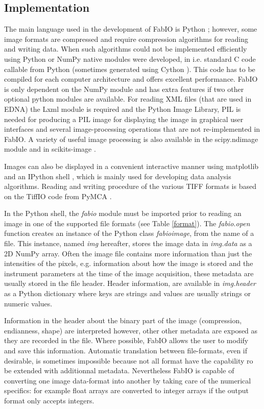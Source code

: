 \documentclass[preprint]{iucr}
\begin{document}
\subsection{Implementation}
The main language used in the development of FabIO is Python \cite{python};
however, some image formats are compressed and require
compression algorithms for reading and writing data. 
When such algorithms could not be implemented efficiently using Python or NumPy
native modules were developed, in i.e. standard C code callable from Python
(sometimes generated using Cython \cite{cython}).
This code has to be compiled for each computer architecture and offers 
excellent performance.
FabIO is only dependent on the NumPy module and has extra features if two other
optional python modules are available. 
For reading XML files (that are used in EDNA) the Lxml  module \cite{lxml} is
required and the Python Image Library, PIL \cite{pil} is needed for producing 
a PIL image for displaying the image in graphical user interfaces and several 
image-processing operations that are not re-implemented in FabIO.
A variety of useful image processing is also available in the scipy.ndimage 
module \cite{scipy} and in scikits-image \cite{skimage}.

Images can also be displayed in a convenient interactive manner using
matplotlib \cite{matplotlib} and an IPython shell \cite{ipython}, which is
mainly used for developing data analysis algorithms.
Reading and writing procedure of the various TIFF \cite{tiff} formats is based
on the TiffIO code from PyMCA \cite{pymca}.

In the Python shell, the {\em fabio} module must be imported prior to reading an
image in one of the supported file formats (see Table \ref{format}).
The {\em fabio.open} function creates an instance of the Python class {\em fabioimage},
from the name of a file. This instance, named {\em img} hereafter, stores the
image data in {\em img.data} as a 2D NumPy array. Often the image file contains
more information than just the intensities of the pixels, e.g.
information about how the image is stored and the instrument parameters at the
time of the image acquisition, these metadata are usually stored in
the file header.
Header information, are available in {\em img.header} as a Python
dictionary where keys are strings and values are usually strings or
numeric values.

Information in the header about the binary part of the image (compression,
endianness, shape) are interpreted however, other other metadata are exposed as
they are recorded in the file. Where possible, FabIO allows the user to modify
and save this information.
Automatic translation between file-formats, even if desirable, is sometimes
impossible because not all format have the capability ro be extended with
additionnal metadata. Nevertheless FabIO is capable of converting one
image data-format into another by taking care of the numerical specifics: 
for example float arrays are converted to integer arrays if the output format only
accepts integers.
\end{document}

